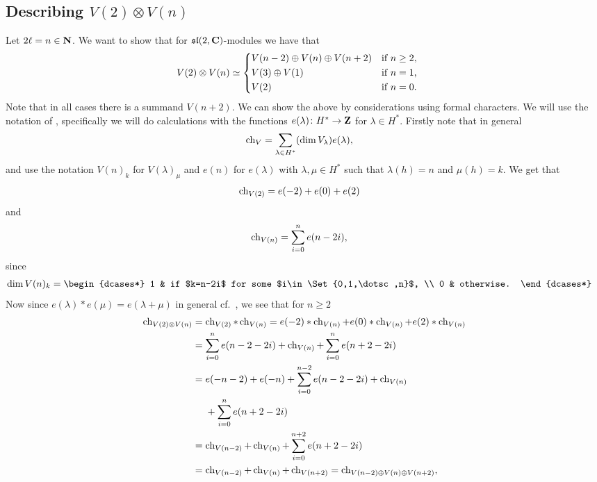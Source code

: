 \subsection{\texorpdfstring{Describing $V(2)\otimes V(n)$}{Describing V(2) tensor product V(n)}}
Let $2\ell=n\in\mathbf{N}$. We want to show that for $\mathfrak{sl}(2,\mathbf{C})$-modules we have that
\begin{align}\label{eq:V(2)tensorV(n)}
  V(2)\otimes V(n) &\simeq
                     \begin{dcases*}
                       V(n-2) \oplus V(n) \oplus V(n+2) & if $n\geq 2$,\\
                       V(3)\oplus V(1) & if $n=1$, \\
                       V(2) & if $n=0$.
                     \end{dcases*}
\end{align}
Note that in all cases there is a summand $V(n+2)$. We can show the above by considerations using formal characters. We will use the notation of \cite[Chapter~8]{jantzen}, specifically we will do calculations with the functions $e(\lambda)\colon H^*\to \mathbf{Z}$ for $\lambda\in H^*$. Firstly note that in general
\begin{align*}
  \operatorname{ch}_V &= \sum_{\lambda\in H^*} (\dim V_\lambda) e(\lambda),
\end{align*}
and use the notation $V(n)_k$ for $V(\lambda)_\mu$ and $e(n)$ for $e(\lambda)$ with $\lambda,\mu\in H^*$ such that $\lambda(h)=n$ and $\mu(h)=k$. We get that
\begin{align*}
  \operatorname{ch}_{V(2)} &= e(-2) + e(0) + e(2)
\end{align*}
and 
\begin{align*}
  \operatorname{ch}_{V(n)} &= \sum_{i=0}^n e(n-2i),
\end{align*}
since
\begin{align*}
  \dim V(n)_k &=
                \begin{dcases*}
                  1 & if $k=n-2i$ for some $i\in\Set{0,1,\dotsc,n}$, \\
                  0 & otherwise.
                \end{dcases*}
\end{align*}
Now since $e(\lambda)*e(\mu)=e(\lambda+\mu)$ in general cf.\ \cite[93]{jantzen}, we see that for $n\geq 2$
\begin{align*}
  \ch_{V(2)\otimes V(n)} &= \ch_{V(2)} * \ch_{V(n)} = e(-2)*\ch_{V(n)} + e(0)*\ch_{V(n)} + e(2)*\ch_{V(n)} \\
                         &= \sum_{i=0}^n e(n-2-2i) + \ch_{V(n)} + \sum_{i=0}^n e(n+2-2i) \\
                         &= e(-n-2)+e(-n) + \sum_{i=0}^{n-2} e(n-2-2i) + \ch_{V(n)} \\*
                         &\phantom{{}={}}+ \sum_{i=0}^n e(n+2-2i) \\
                         &= \ch_{V(n-2)} + \ch_{V(n)} + \sum_{i=0}^{n+2} e(n+2-2i) \\
  &= \ch_{V(n-2)} + \ch_{V(n)} + \ch_{V(n+2)} = \ch_{V(n-2)\oplus V(n)\oplus V(n+2)},
\end{align*}
